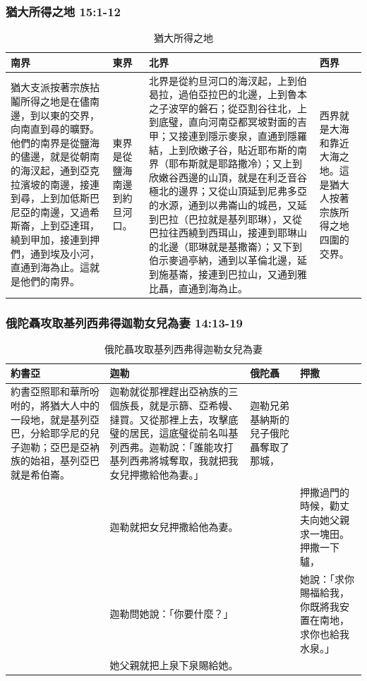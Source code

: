 \subsubsection{猶大所得之地 15:1-12}
\begin{table}[H]
\centering
\begin{tabular}{p{4.7cm}|p{0.79cm}|p{8.7cm}|p{1.5cm}}\hline\hline
南界&東界&北界&西界\\\hline
猶大支派按著宗族拈鬮所得之地是在儘南邊，到以東的交界，向南直到尋的曠野。他們的南界是從鹽海的儘邊，就是從朝南的海汊起，通到亞克拉濱坡的南邊，接連到尋，上到加低斯巴尼亞的南邊，又過希斯崙，上到亞達珥，繞到甲加，接連到押們，通到埃及小河，直通到海為止。這就是他們的南界。 
&東界是從鹽海南邊到約旦河口。
&北界是從約旦河口的海汊起，上到伯曷拉，過伯亞拉巴的北邊，上到魯本之子波罕的磐石；從亞割谷往北，上到底璧，直向河南亞都冥坡對面的吉甲；又接連到隱示麥泉，直通到隱羅結，上到欣嫩子谷，貼近耶布斯的南界（耶布斯就是耶路撒冷）；又上到欣嫩谷西邊的山頂，就是在利乏音谷極北的邊界；又從山頂延到尼弗多亞的水源，通到以弗崙山的城邑，又延到巴拉（巴拉就是基列耶琳），又從巴拉往西繞到西珥山，接連到耶琳山的北邊（耶琳就是基撒崙）；又下到伯示麥過亭納，通到以革倫北邊，延到施基崙，接連到巴拉山，又通到雅比聶，直通到海為止。
&西界就是大海和靠近大海之地。這是猶大人按著宗族所得之地四圍的交界。\\\hline
 \end{tabular}
\caption{猶大所得之地}
\end{table}


\subsubsection{俄陀聶攻取基列西弗得迦勒女兒為妻 14:13-19}
\begin{table}[H]
\centering
\begin{tabular}{p{}|p{5.2cm}|p{1.7cm}|p{}}\hline\hline
約書亞&迦勒&俄陀聶&押撒\\\hline
約書亞照耶和華所吩咐的，將猶大人中的一段地，就是基列亞巴，分給耶孚尼的兒子迦勒；亞巴是亞衲族的始祖，基列亞巴就是希伯崙。
&迦勒就從那裡趕出亞衲族的三個族長，就是示篩、亞希幔、撻買。又從那裡上去，攻擊底璧的居民，這底璧從前名叫基列西弗。迦勒說：「誰能攻打基列西弗將城奪取，我就把我女兒押撒給他為妻。」
&迦勒兄弟基納斯的兒子俄陀聶奪取了那城，
&\\\hline
&迦勒就把女兒押撒給他為妻。&&押撒過門的時候，勸丈夫向她父親求一塊田。押撒一下驢，\\\hline
&迦勒問她說：「你要什麼？」&&她說：「求你賜福給我，你既將我安置在南地，求你也給我水泉。」\\\hline
&她父親就把上泉下泉賜給她。&&\\\hline
 \end{tabular}
\caption{俄陀聶攻取基列西弗得迦勒女兒為妻}
\end{table}

